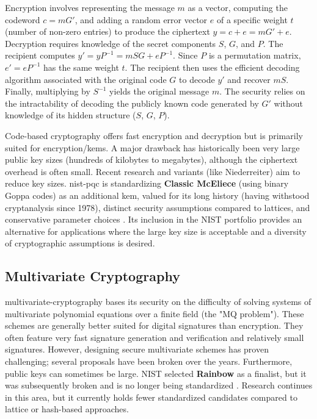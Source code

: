 Encryption involves representing the message $m$ as a vector, computing the codeword $c = mG'$, and adding a random error vector $e$ of a specific weight $t$ (number of non-zero entries) to produce the ciphertext $y = c + e = mG' + e$. Decryption requires knowledge of the secret components $S$, $G$, and $P$. The recipient computes $y' = yP^{-1} = mSG + eP^{-1}$. Since $P$ is a permutation matrix, $e' = eP^{-1}$ has the same weight $t$. The recipient then uses the efficient decoding algorithm associated with the original code $G$ to decode $y'$ and recover $mS$. Finally, multiplying by $S^{-1}$ yields the original message $m$. The security relies on the intractability of decoding the publicly known code generated by $G'$ without knowledge of its hidden structure ($S$, $G$, $P$).

Code-based cryptography offers fast encryption and decryption but is primarily suited for encryption/\glspl{kem}. A major drawback has historically been very large public key sizes (hundreds of kilobytes to megabytes), although the ciphertext overhead is often small. Recent research and variants (like Niederreiter) aim to reduce key sizes. \Gls{nist-pqc} is standardizing \textbf{Classic McEliece} (using binary Goppa codes) as an additional \gls{kem}, valued for its long history (having withstood cryptanalysis since 1978), distinct security assumptions compared to lattices, and conservative parameter choices \parencite{code_based_2024, nist_pqc_status_report_ir8413}. Its inclusion in the NIST portfolio provides an alternative for applications where the large key size is acceptable and a diversity of cryptographic assumptions is desired.

\subsection{Multivariate Cryptography}\label{subsec:multivariate_ch6}
\Gls{multivariate-cryptography} bases its security on the difficulty of solving systems of multivariate polynomial equations over a finite field (the "MQ problem"). These schemes are generally better suited for digital signatures than encryption. They often feature very fast signature generation and verification and relatively small signatures. However, designing secure multivariate schemes has proven challenging; several proposals have been broken over the years. Furthermore, public keys can sometimes be large. NIST selected \textbf{Rainbow} as a finalist, but it was subsequently broken and is no longer being standardized \parencite{djelic2021nist}. Research continues in this area, but it currently holds fewer standardized candidates compared to lattice or hash-based approaches.

